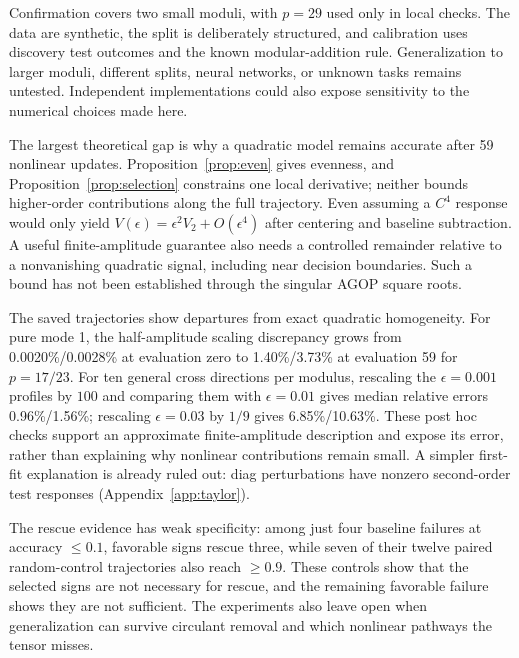 \documentclass[11pt]{article}
\begin{document}
Confirmation covers two small moduli, with $p=29$ used only in local checks. The data are synthetic, the split is deliberately structured, and calibration uses discovery test outcomes and the known modular-addition rule. Generalization to larger moduli, different splits, neural networks, or unknown tasks remains untested. Independent implementations could also expose sensitivity to the numerical choices made here.

The largest theoretical gap is why a quadratic model remains accurate after 59 nonlinear updates. Proposition~\ref{prop:even} gives evenness, and Proposition~\ref{prop:selection} constrains one local derivative; neither bounds higher-order contributions along the full trajectory. Even assuming a $C^4$ response would only yield $V(\epsilon)=\epsilon^2V_2+O(\epsilon^4)$ after centering and baseline subtraction. A useful finite-amplitude guarantee also needs a controlled remainder relative to a nonvanishing quadratic signal, including near decision boundaries. Such a bound has not been established through the singular AGOP square roots.

The saved trajectories show departures from exact quadratic homogeneity. For pure mode 1, the half-amplitude scaling discrepancy grows from 0.0020\%/0.0028\% at evaluation zero to 1.40\%/3.73\% at evaluation 59 for $p=17/23$. For ten general cross directions per modulus, rescaling the $\epsilon=0.001$ profiles by $100$ and comparing them with $\epsilon=0.01$ gives median relative errors 0.96\%/1.56\%; rescaling $\epsilon=0.03$ by $1/9$ gives 6.85\%/10.63\%. These post hoc checks support an approximate finite-amplitude description and expose its error, rather than explaining why nonlinear contributions remain small. A simpler first-fit explanation is already ruled out: diag perturbations have nonzero second-order test responses (Appendix~\ref{app:taylor}).

The rescue evidence has weak specificity: among just four baseline failures at accuracy $\le0.1$, favorable signs rescue three, while seven of their twelve paired random-control trajectories also reach $\ge0.9$. These controls show that the selected signs are not necessary for rescue, and the remaining favorable failure shows they are not sufficient. The experiments also leave open when generalization can survive circulant removal and which nonlinear pathways the tensor misses.
\end{document}
